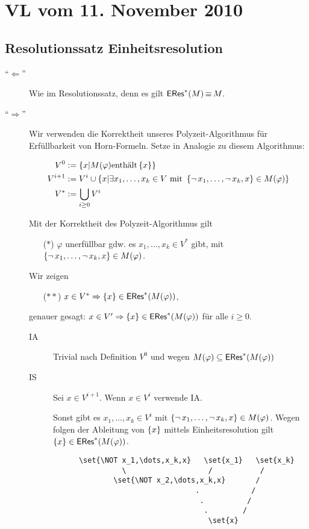 \section{VL vom 11. November 2010}

\subsection{Resolutionssatz Einheitsresolution}

\begin{description}
  \item[\enquote{$\Leftarrow$}]
  Wie im Resolutionssatz, denn es gilt $\operatorname{\text{\textsf{ERes}}}^*(M)\operatorname{\equiv} M$.
  
  \item[\enquote{$\Rightarrow$}]
  Wir verwenden die Korrektheit unseres Polyzeit-Algorithmus für Erfüllbarkeit
  von Horn-Formeln. Setze in Analogie zu diesem Algorithmus:
  
  \begin{align}
    V^0     &:= \set{x| M(\varphi) \text{enthält} \set{x}} \\
    V^{i+1} &:= V^i \cup \set{x| \exists x_1,\dots,x_k \in V\ \text{mit}\ \set{\NOT x_1,\dots,\NOT x_k,x} \in M(\varphi)} \\
    V^*     &:= \bigcup_{i\geq 0} V^i \\
  \end{align}
  
  Mit der Korrektheit des Polyzeit-Algorithmus gilt
  \begin{itemize}
    \item[($*$)] $\varphi$ unerfüllbar gdw. es $x_1,\dots,x_k \in V^*$ gibt, mit
    $\left\{\operatorname{\neg} x_1,\dots,\operatorname{\neg} x_k,x\right\}\in M(\varphi)$.
  \end{itemize}
  
  Wir zeigen
  \begin{itemize}
    \item[($**$)] $x\in V^* \Rightarrow \left\{x\right\} \in \operatorname{\text{\textsf{ERes}}}^*(M(\varphi))$,
  \end{itemize}
  genauer gesagt: $x\in V' \Rightarrow \left\{x\right\} \in \operatorname{\text{\textsf{ERes}}}^*(M(\varphi))$ für
  alle $i\geq 0$.

  
  \begin{description}
    \item[IA] Trivial nach Definition $V^0$ und wegen $M(\varphi) \subseteq \operatorname{\text{\textsf{ERes}}}^*(M(\varphi))$
    \item[IS] Sei $x \in V^{i+1}$. Wenn $x\in V^i$ verwende IA.
    
    Sonst gibt es $x_1,\dots,x_k \in V^i$ mit $\left\{\operatorname{\neg} x_1,\dots,\operatorname{\neg} x_k,x\right\} \in M(\varphi)$.
    Wegen folgen der Ableitung von $\left\{x\right\}$ mittels Einheitsresolution gilt $\left\{x\right\}\in \operatorname{\text{\textsf{ERes}}}^*(M(\varphi))$.
    \begin{verbatim}
      \set{\NOT x_1,\dots,x_k,x}   \set{x_1}   \set{x_k}
                \                   /           /
              \set{\NOT x_2,\dots,x_k,x}       /
                                 .            /
                                  .          /
                                   .        /
                                    \set{x}
    \end{verbatim}
    

\end{description}
\end{description}

